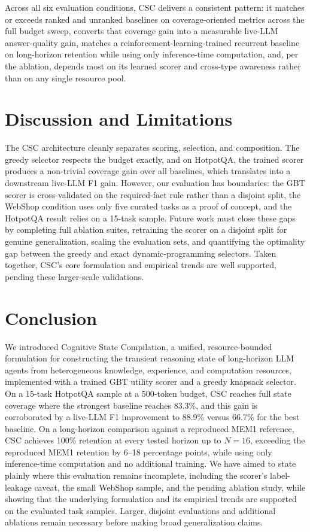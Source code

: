 \documentclass{article}
\begin{document}
Across all six evaluation conditions, CSC delivers a consistent pattern: it matches or exceeds ranked and unranked baselines on coverage-oriented metrics across the full budget sweep, converts that coverage gain into a measurable live-LLM answer-quality gain, matches a reinforcement-learning-trained recurrent baseline on long-horizon retention while using only inference-time computation, and, per the ablation, depends most on its learned scorer and cross-type awareness rather than on any single resource pool.

\section{Discussion and Limitations}

The CSC architecture cleanly separates scoring, selection, and composition. The greedy selector respects the budget exactly, and on HotpotQA, the trained scorer produces a non-trivial coverage gain over all baselines, which translates into a downstream live-LLM F1 gain. However, our evaluation has boundaries: the GBT scorer is cross-validated on the required-fact rule rather than a disjoint split, the WebShop condition uses only five curated tasks as a proof of concept, and the HotpotQA result relies on a 15-task sample. Future work must close these gaps by completing full ablation suites, retraining the scorer on a disjoint split for genuine generalization, scaling the evaluation sets, and quantifying the optimality gap between the greedy and exact dynamic-programming selectors. Taken together, CSC's core formulation and empirical trends are well supported, pending these larger-scale validations.

\section{Conclusion}

We introduced Cognitive State Compilation, a unified, resource-bounded formulation for constructing the transient reasoning state of long-horizon LLM agents from heterogeneous knowledge, experience, and computation resources, implemented with a trained GBT utility scorer and a greedy knapsack selector. On a 15-task HotpotQA sample at a 500-token budget, CSC reaches full state coverage where the strongest baseline reaches 83.3\%, and this gain is corroborated by a live-LLM F1 improvement to 88.9\% versus 66.7\% for the best baseline. On a long-horizon comparison against a reproduced MEM1 reference, CSC achieves 100\% retention at every tested horizon up to $N=16$, exceeding the reproduced MEM1 retention by 6--18 percentage points, while using only inference-time computation and no additional training. We have aimed to state plainly where this evaluation remains incomplete, including the scorer's label-leakage caveat, the small WebShop sample, and the pending ablation study, while showing that the underlying formulation and its empirical trends are supported on the evaluated task samples. Larger, disjoint evaluations and additional ablations remain necessary before making broad generalization claims.
\end{document}
